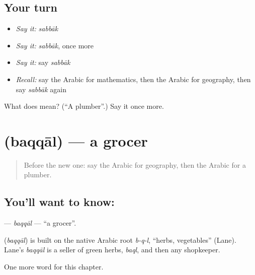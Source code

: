 \subsection*{Your turn}
\begin{itemize}
\raggedright
  \item \emph{Say it:} \emph{sabbāk}
  \item \emph{Say it:} \emph{sabbāk}, once more
  \item \emph{Say it:} say \emph{sabbāk}
  \item \emph{Recall:} say the Arabic for mathematics, then the Arabic for geography, then say \emph{sabbāk} again
\end{itemize}

\begin{tcolorbox}[breakable,colback=teal!4,colframe=teal!35!black,title={Before you move on}]
What does  mean? (\textquotedblleft{}A plumber\textquotedblright{}.) Say it once more.
\end{tcolorbox}
\section[\texorpdfstring{\ar{بقال} (baqqāl)}{بقال (baqqāl)}]{ (baqqāl) — a grocer}

\label{lesson:AR-C191-baqqal}



\begin{quote}
Before the new one: say the Arabic for geography, then the Arabic for a plumber.
\end{quote}

\subsection*{You'll want to know: }
\textbf{} — \emph{baqqāl} — \textquotedblleft{}a grocer\textquotedblright{}.

\begin{cousinweb}
\textbf{} (\emph{baqqāl}) is built on the native Arabic root \emph{b-q-l}, \textquotedblleft{}herbs, vegetables\textquotedblright{} (Lane). Lane's \emph{baqqāl} is a seller of green herbs, \emph{baql}, and then any shopkeeper.
\end{cousinweb}

\begin{grammarlens}[title={What you've built}]
One more word for this chapter.
\end{grammarlens}

